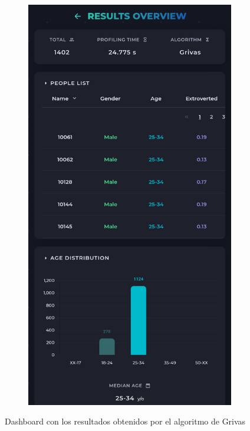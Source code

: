 \begin{figure}[H]
\begin{subfigure}[c]{0.21\textwidth}
		\includegraphics[width=\textwidth]{imagenes/dashboard-grivas-500_movil.png}
		\label{fig:casouso_dashboard_grivas_movil}
	\end{subfigure}
	\vspace{-1\baselineskip}
	\caption{Dashboard con los resultados obtenidos por el algoritmo de Grivas \cite{grivas2015author}}
	\label{fig:casouso_dashboard_grivas}
\end{figure}

